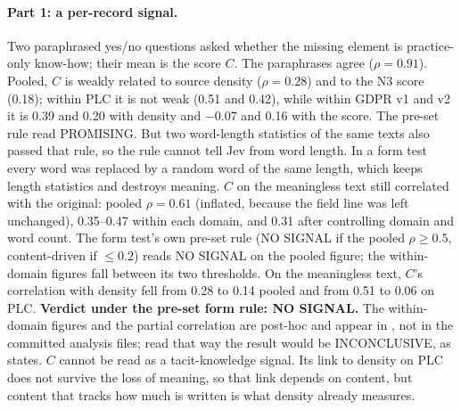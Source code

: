 \paragraph{Part 1: a per-record signal.} \evobs{} Two paraphrased yes/no questions asked whether the
missing element is practice-only know-how; their mean is the score $C$. The paraphrases agree
($\rho = 0.91$). Pooled, $C$ is weakly related to source density ($\rho = 0.28$) and to the N3 score
(0.18); within PLC it is not weak (0.51 and 0.42), while within GDPR v1 and v2 it is 0.39 and 0.20 with
density and $-0.07$ and 0.16 with the score. The pre-set rule read PROMISING. But two word-length
statistics of the same texts also passed that rule, so the rule cannot tell Jev from word length. In a
form test every word was replaced by a random word of the same length, which keeps length statistics
and destroys meaning. $C$ on the meaningless text still correlated with the original: pooled
$\rho = 0.61$ (inflated, because the field line was left unchanged), 0.35--0.47 within each domain, and
0.31 after controlling domain and word count. The form test's own pre-set rule (NO SIGNAL if the
pooled $\rho \geq 0.5$, content-driven if $\leq 0.2$) reads NO SIGNAL on the pooled figure; the
within-domain figures fall between its two thresholds. On the meaningless text, $C$'s correlation with
density fell from 0.28 to 0.14 pooled and from 0.51 to 0.06 on PLC. \textbf{Verdict under the pre-set form rule: NO SIGNAL.} The within-domain figures and the partial correlation are post-hoc and appear in , not in the committed analysis files; read that way the result would be INCONCLUSIVE, as  states. \evint{} $C$ cannot be read as
a tacit-knowledge signal. Its link to density on PLC does not survive the loss of meaning, so that link
depends on content, but content that tracks how much is written is what density already measures.

